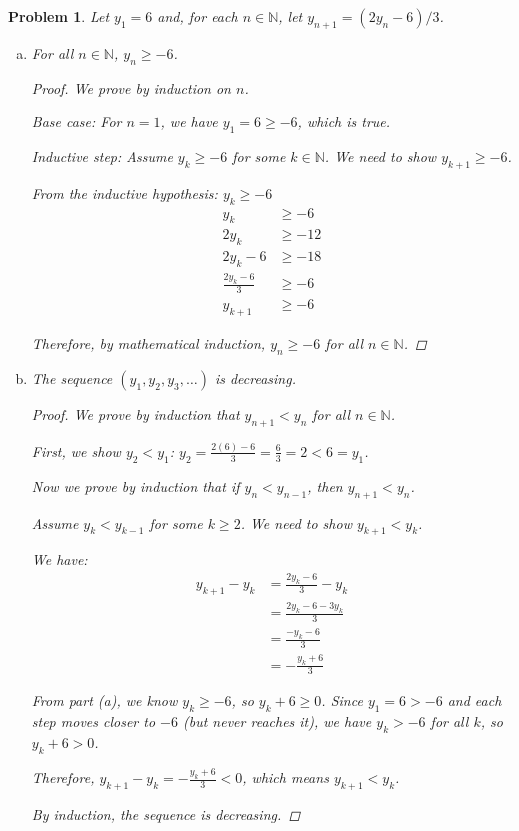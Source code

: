 \documentclass[12pt]{article}
\newtheorem{problem}{Problem}
\newcommand{\NN}{\ensuremath{\mathbb N}}
\begin{document}
\begin{problem} %
Let $y_1=6$ and, for each $n\in\NN$, let $y_{n+1} = (2 y_n - 6) / 3$.
 
\begin{enumerate}[(a)]
\item For all $n\in \NN$, $y_n \ge -6$.

\begin{proof}
	We prove by induction on $n$.

Base case: For $n = 1$, we have $y_1 = 6 \ge -6$, which is true.

Inductive step: Assume $y_k \ge -6$ for some $k \in \NN$. We need to show $y_{k+1} \ge -6$.

From the inductive hypothesis: $y_k \ge -6$
\begin{align*}
y_k &\ge -6 \\
2y_k &\ge -12 \\
2y_k - 6 &\ge -18 \\
\frac{2y_k - 6}{3} &\ge -6 \\
y_{k+1} &\ge -6
\end{align*}

Therefore, by mathematical induction, $y_n \ge -6$ for all $n \in \NN$.
\end{proof}

\item The sequence $(y_1,y_2,y_3,\dots)$ is decreasing.

\begin{proof}
	We prove by induction that $y_{n+1} < y_n$ for all $n \in \NN$.

First, we show $y_2 < y_1$:
$y_2 = \frac{2(6) - 6}{3} = \frac{6}{3} = 2 < 6 = y_1$.

Now we prove by induction that if $y_n < y_{n-1}$, then $y_{n+1} < y_n$.

Assume $y_k < y_{k-1}$ for some $k \ge 2$. We need to show $y_{k+1} < y_k$.

We have:
\begin{align*}
y_{k+1} - y_k &= \frac{2y_k - 6}{3} - y_k \\
&= \frac{2y_k - 6 - 3y_k}{3} \\
&= \frac{-y_k - 6}{3} \\
&= -\frac{y_k + 6}{3}
\end{align*}

From part (a), we know $y_k \ge -6$, so $y_k + 6 \ge 0$. Since $y_1 = 6 > -6$ and each step moves closer to $-6$ (but never reaches it), we have $y_k > -6$ for all $k$, so $y_k + 6 > 0$.

Therefore, $y_{k+1} - y_k = -\frac{y_k + 6}{3} < 0$, which means $y_{k+1} < y_k$.

By induction, the sequence is decreasing.
\end{proof}
\end{enumerate}
\end{problem}
\end{document}
